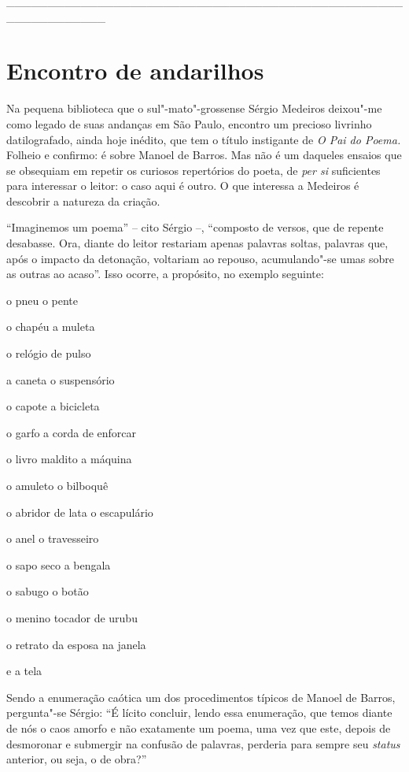 \_\_\_\_\_\_\_\_\_\_\_\_\_\_\_\_\_\_\_\_\_\_\_\_\_\_\_\_\_\_\_\_\_\_\_\_\_\_\_\_\_\_\_\_\_\_\_\_\_\_\_\_\_\_\_\_\_\_\_\_

\chapter{Encontro de andarilhos}

Na pequena biblioteca que o sul"-mato"-grossense Sérgio Medeiros deixou"-me
como legado de suas andanças em São Paulo, encontro um precioso livrinho
datilografado, ainda hoje inédito, que tem o título instigante de
\emph{O Pai do Poema.} Folheio e confirmo: é sobre Manoel de Barros. Mas
não é um daqueles ensaios que se obsequiam em repetir os curiosos
repertórios do poeta, de \emph{per si} suficientes para interessar o
leitor: o caso aqui é outro. O que interessa a Medeiros é descobrir a
natureza da criação.

``Imaginemos um poema'' -- cito Sérgio --, ``composto de versos, que de
repente desabasse. Ora, diante do leitor restariam apenas palavras
soltas, palavras que, após o impacto da detonação, voltariam ao repouso,
acumulando"-se umas sobre as outras ao acaso''. Isso ocorre, a propósito,
no exemplo seguinte:

o pneu o pente

o chapéu a muleta

o relógio de pulso

a caneta o suspensório

o capote a bicicleta

o garfo a corda de enforcar

o livro maldito a máquina

o amuleto o bilboquê

o abridor de lata o escapulário

o anel o travesseiro

o sapo seco a bengala

o sabugo o botão

o menino tocador de urubu

o retrato da esposa na janela

e a tela

Sendo a enumeração caótica um dos procedimentos típicos de Manoel de
Barros, pergunta"-se Sérgio: ``É lícito concluir, lendo essa enumeração,
que temos diante de nós o caos amorfo e não exatamente um poema, uma vez
que este, depois de desmoronar e submergir na confusão de palavras,
perderia para sempre seu \emph{status} { } anterior, ou seja, o de
obra?''

